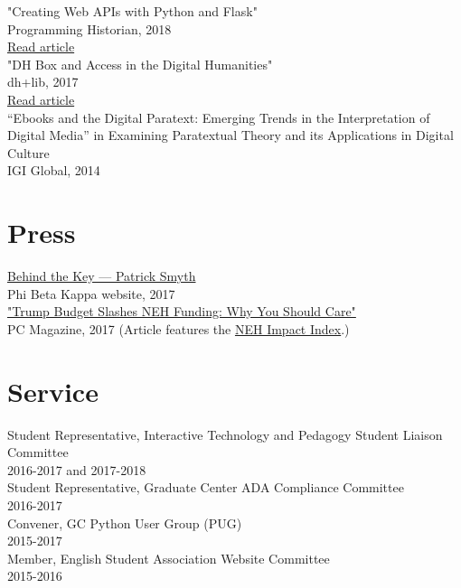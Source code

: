 \documentclass[11pt]{article}
\begin{document}
"Creating Web APIs with Python and Flask"\\
Programming Historian, 2018\\
\href{https://programminghistorian.org/lessons/creating-apis-with-python-and-flask}{Read article}\\


"DH Box and Access in the Digital Humanities"\\
dh+lib, 2017\\
\href{http://acrl.ala.org/dh/2017/06/21/dh-box-and-access-in-the-digital-humanities/}{Read article}\\

“Ebooks and the Digital Paratext: Emerging Trends in the Interpretation of Digital Media” in Examining Paratextual Theory and its Applications in Digital Culture\\
IGI Global, 2014\\

\section*{Press}
\label{sec:orgheadline4}
\href{https://www.pbk.org/Behind-the-Key/Patrick-Smyth}{Behind the Key — Patrick Smyth}\\
Phi Beta Kappa website, 2017\\

\href{http://www.pcmag.com/commentary/353904/trump-budget-slashes-neh-funding-why-you-should-care}{"Trump Budget Slashes NEH Funding: Why You Should Care"}\\
PC Magazine, 2017 (Article features the \href{http://www.nehimpact.org/}{NEH Impact Index}.)\\

\section*{Service}
\label{sec:orgheadline5}
Student Representative, Interactive Technology and Pedagogy Student Liaison Committee\\
2016-2017 and 2017-2018\\

Student Representative, Graduate Center ADA Compliance Committee\\
2016-2017\\

Convener, GC Python User Group (PUG)\\
2015-2017\\

Member, English Student Association Website Committee\\
2015-2016\\
\end{document}
